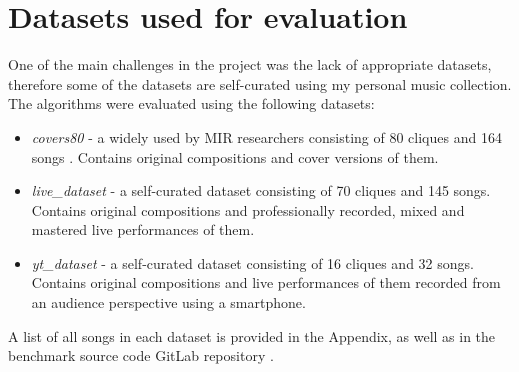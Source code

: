 \section{Datasets used for evaluation} 
\label{sec:datasets}
One of the main challenges in the project was the lack of appropriate datasets,
therefore some of the datasets are self-curated using my personal music
collection. The algorithms were evaluated using the following datasets:
\begin{itemize}
    \item \textit{covers80} - a widely used by MIR researchers consisting of 80
    cliques and 164 songs \cite{covers80}. Contains original compositions and
    cover versions of them.
    \item \textit{live\_dataset} - a self-curated dataset consisting of 70
    cliques and 145 songs. Contains original compositions and professionally
    recorded, mixed and mastered live performances of them.
    \item \textit{yt\_dataset} - a self-curated dataset consisting of 16 cliques
    and 32 songs. Contains original compositions and live performances of them
    recorded from an audience perspective using a smartphone.
\end{itemize}

A list of all songs in each dataset is provided in the Appendix, as well as in
the benchmark source code GitLab repository \cite{gitlabrepo}.
